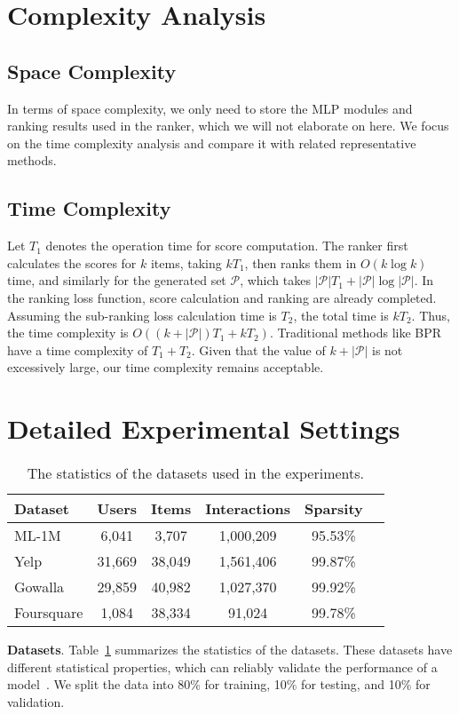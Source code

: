 \section{Complexity Analysis}
\subsection{Space Complexity}
\label{app:comp}
In terms of space complexity, we only need to store the MLP modules and ranking results used in the ranker, which we will not elaborate on here. We focus on the time complexity analysis and compare it with related representative methods.
\subsection{Time Complexity}
Let $T_1$ denotes the operation time for score computation. The ranker first calculates the scores for $k$ items, taking $kT_1$, then ranks them in $O(k \log k)$ time, and similarly for the generated set $\mathcal{P}$, which takes $|\mathcal{P}|T_1 + |\mathcal{P}| \log |\mathcal{P}|$. In the ranking loss function, score calculation and ranking are already completed. Assuming the sub-ranking loss calculation time is $T_2$, the total time is $kT_2$. Thus, the time complexity is $O((k + |\mathcal{P}|)T_1 + kT_2)$. Traditional methods like BPR have a time complexity of $T_1 + T_2$. Given that the value of $k + |\mathcal{P}|$ is not excessively large, our time complexity remains acceptable.


\section{Detailed Experimental Settings}
\label{app:exp}
% 
\begin{table}[t]
\caption{The statistics of the datasets used in the experiments.}
\begin{center}
\begin{tabular}{@{}lccccc@{}}
\toprule
\textbf{Dataset} & \textbf{Users} & \textbf{Items} & \textbf{Interactions} & \textbf{Sparsity}\\ \midrule
ML-1M & 6,041 & 3,707 & 1,000,209 & 95.53\%\\ 
Yelp & 31,669 & 38,049 & 1,561,406 & 99.87\% \\ 
Gowalla & 29,859 & 40,982 & 1,027,370 & 99.92\% \\
Foursquare & 1,084 &38,334 & 91,024 & 99.78\%\\
\bottomrule
\end{tabular}
\label{tab:statistics}
\end{center}
\vspace{-3mm}
\end{table}
\textbf{Datasets}. 
Table~\ref{tab:statistics} summarizes the statistics of the datasets. These datasets have different statistical properties, which can reliably validate the performance of a model~\cite{CCC22}. We split the data into 80\% for training, 10\% for testing, and 10\% for validation. 

